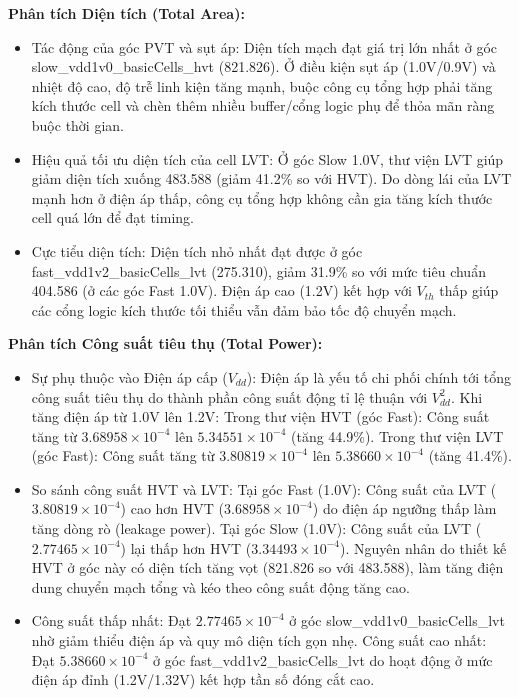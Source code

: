 \documentclass[12pt,a4paper,oneside]{book}
\begin{document}
\textbf{Phân tích Diện tích (Total Area):}
\begin{itemize}
    \item Tác động của góc PVT và sụt áp: Diện tích mạch đạt giá trị lớn nhất ở góc slow\_vdd1v0\_basicCells\_hvt (821.826). Ở điều kiện sụt áp (1.0V/0.9V) và nhiệt độ cao, độ trễ linh kiện tăng mạnh, buộc công cụ tổng hợp phải tăng kích thước cell và chèn thêm nhiều buffer/cổng logic phụ để thỏa mãn ràng buộc thời gian.
    \item Hiệu quả tối ưu diện tích của cell LVT: Ở góc Slow 1.0V, thư viện LVT giúp giảm diện tích xuống 483.588 (giảm 41.2\% so với HVT). Do dòng lái của LVT mạnh hơn ở điện áp thấp, công cụ tổng hợp không cần gia tăng kích thước cell quá lớn để đạt timing.
    \item Cực tiểu diện tích: Diện tích nhỏ nhất đạt được ở góc fast\_vdd1v2\_basicCells\_lvt (275.310), giảm 31.9\% so với mức tiêu chuẩn 404.586 (ở các góc Fast 1.0V). Điện áp cao (1.2V) kết hợp với $V_{th}$ thấp giúp các cổng logic kích thước tối thiểu vẫn đảm bảo tốc độ chuyển mạch.
\end{itemize}

\textbf{Phân tích Công suất tiêu thụ (Total Power):}
\begin{itemize}
    \item Sự phụ thuộc vào Điện áp cấp ($V_{dd}$): Điện áp là yếu tố chi phối chính tới tổng công suất tiêu thụ do thành phần công suất động tỉ lệ thuận với $V_{dd}^2$. Khi tăng điện áp từ 1.0V lên 1.2V: Trong thư viện HVT (góc Fast): Công suất tăng từ $3.68958 \times 10^{-4}$ lên $5.34551 \times 10^{-4}$ (tăng 44.9\%). Trong thư viện LVT (góc Fast): Công suất tăng từ $3.80819 \times 10^{-4}$ lên $5.38660 \times 10^{-4}$ (tăng 41.4\%).
    \item So sánh công suất HVT và LVT: Tại góc Fast (1.0V): Công suất của LVT ($3.80819 \times 10^{-4}$) cao hơn HVT ($3.68958 \times 10^{-4}$) do điện áp ngưỡng thấp làm tăng dòng rò (leakage power). Tại góc Slow (1.0V): Công suất của LVT ($2.77465 \times 10^{-4}$) lại thấp hơn HVT ($3.34493 \times 10^{-4}$). Nguyên nhân do thiết kế HVT ở góc này có diện tích tăng vọt (821.826 so với 483.588), làm tăng điện dung chuyển mạch tổng và kéo theo công suất động tăng cao.
    \item Công suất thấp nhất: Đạt $2.77465 \times 10^{-4}$ ở góc slow\_vdd1v0\_basicCells\_lvt nhờ giảm thiểu điện áp và quy mô diện tích gọn nhẹ. Công suất cao nhất: Đạt $5.38660 \times 10^{-4}$ ở góc fast\_vdd1v2\_basicCells\_lvt do hoạt động ở mức điện áp đỉnh (1.2V/1.32V) kết hợp tần số đóng cắt cao.
\end{itemize}
\end{document}
